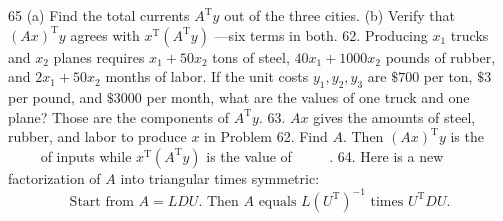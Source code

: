 65
(a) Find the total currents $A^{\mathrm{T}} y$ out of the three cities.
(b) Verify that $(A x)^{\mathrm{T}} y$ agrees with $x^{\mathrm{T}}\left(A^{\mathrm{T}} y\right)$ —six terms in both.
62. Producing $x_1$ trucks and $x_2$ planes requires $x_1+50 x_2$ tons of steel, $40 x_1+1000 x_2$ pounds of rubber, and $2 x_1+50 x_2$ months of labor. If the unit costs $y_1, y_2, y_3$ are $\$ 700$ per ton, $\$ 3$ per pound, and $\$ 3000$ per month, what are the values of one truck and one plane? Those are the components of $A^{\mathrm{T}} y$.
63. $A x$ gives the amounts of steel, rubber, and labor to produce $x$ in Problem 62. Find $A$. Then $(A x)^{\mathrm{T}} y$ is the $\qquad$ of inputs while $x^{\mathrm{T}}\left(A^{\mathrm{T}} y\right)$ is the value of $\qquad$ .
64. Here is a new factorization of $A$ into triangular times symmetric:
$$
\text { Start from } A=L D U \text {. Then } A \text { equals } L\left(U^{\mathrm{T}}\right)^{-1} \text { times } U^{\mathrm{T}} D U \text {. }
$$

